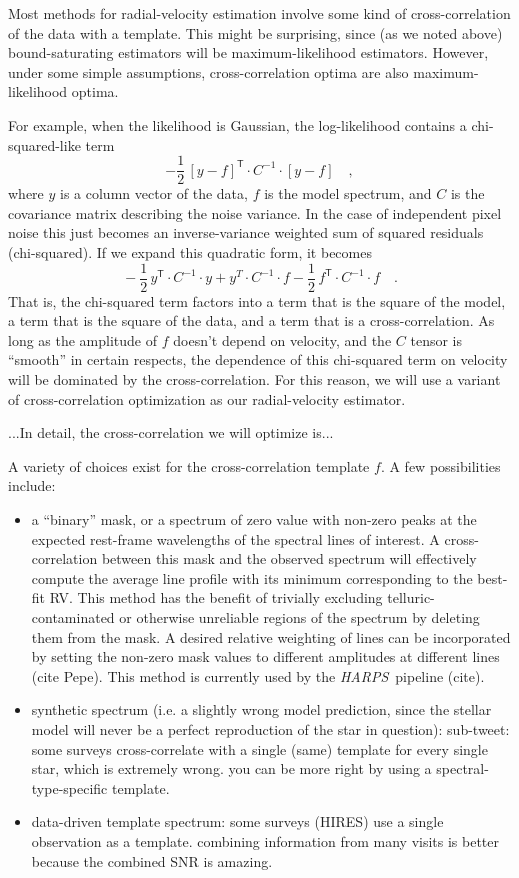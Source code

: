 \documentclass[modern]{aastex61}
\newcommand{\T}{^{\mathsf{T}}}
\newcommand{\acronym}[1]{{\small{#1}}}
\newcommand{\project}[1]{\textsl{#1}}
\newcommand{\HARPS}{\project{\acronym{HARPS}}}
\begin{document}
Most methods for radial-velocity estimation involve some kind of
cross-correlation of the data with a template.
This might be surprising, since (as we noted above) bound-saturating
estimators will be maximum-likelihood estimators.
However, under some simple assumptions, cross-correlation optima are
also maximum-likelihood optima.

For example, when the likelihood is Gaussian, the log-likelihood
contains a chi-squared-like term
\begin{equation}
-\frac{1}{2}\,[y - f]\T\cdot C^{-1}\cdot [y - f] \quad ,
\end{equation}
where $y$ is a column vector of the data, $f$ is the model spectrum,
and $C$ is the covariance matrix describing the noise variance.
In the case of independent pixel noise this just becomes an
inverse-variance weighted sum of squared residuals (chi-squared).
If we expand this quadratic form, it becomes
\begin{equation}
{}-\frac{1}{2}\,y\T\cdot C^{-1}\cdot y + y^T\cdot C^{-1}\cdot f 
-\frac{1}{2}\,f\T\cdot C^{-1}\cdot f \quad.
\end{equation}
That is, the chi-squared term factors into a term that is the square
of the model, a term that is the square of the data, and a term that
is a cross-correlation.
As long as the amplitude of $f$ doesn't depend on velocity, and the
$C$ tensor is ``smooth'' in certain respects, the dependence of this
chi-squared term on velocity will be dominated by the
cross-correlation.
For this reason, we will use a variant of cross-correlation
optimization as our radial-velocity estimator.

...In detail, the cross-correlation we will optimize is...

A variety of choices exist for the cross-correlation template $f$. A few possibilities include:
\begin{itemize}
\item a ``binary'' mask, or a spectrum of zero value with non-zero peaks at the expected rest-frame wavelengths of the spectral lines of interest. A cross-correlation between this mask and the observed spectrum will effectively compute the average line profile with its minimum corresponding to the best-fit RV. This method has the benefit of trivially excluding telluric-contaminated or otherwise unreliable regions of the spectrum by deleting them from the mask. A desired relative weighting of lines can be incorporated by setting the non-zero mask values to different amplitudes at different lines (cite Pepe). This method is currently used by the \HARPS\ pipeline (cite).
\item synthetic spectrum (i.e. a slightly wrong model prediction, since the stellar model will never be a perfect reproduction of the star in question): sub-tweet: some surveys cross-correlate with a single (same) template for every single star, which is extremely wrong. you can be more right by using a spectral-type-specific template.
\item data-driven template spectrum: some surveys (HIRES) use a single observation as a template. combining information from many visits is better because the combined SNR is amazing.
\end{itemize}
\end{document}
